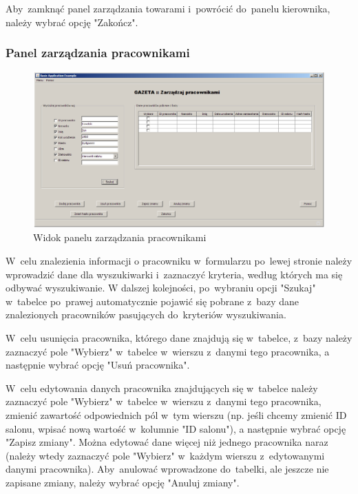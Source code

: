 Aby~zamknąć panel zarządzania towarami i~powrócić do~panelu kierownika, należy wybrać opcję "Zakończ".
\clearpage
\subsubsection{Panel zarządzania pracownikami}
\begin{figure}[h]
\begin{center}
\includegraphics[width=20cm,angle=90,keepaspectratio]{gfx/zarzadzaj_pracownikami.png}
\end{center}
\caption{Widok panelu zarządzania pracownikami}
\end{figure}
W~celu znalezienia informacji o pracowniku w~formularzu po~lewej stronie należy wprowadzić dane dla wyszukiwarki i~zaznaczyć kryteria, według których ma się odbywać wyszukiwanie. W dalszej kolejności, po~wybraniu opcji "Szukaj" w~tabelce po~prawej automatycznie pojawić się pobrane z~bazy dane znalezionych pracowników pasujących do~kryteriów wyszukiwania.

W~celu usunięcia pracownika, którego dane znajdują się w~tabelce, z~bazy należy zaznaczyć pole "Wybierz" w~tabelce w~wierszu z~danymi tego pracownika, a następnie wybrać opcję "Usuń pracownika".

W~celu edytowania danych pracownika znajdujących się w~tabelce należy zaznaczyć pole "Wybierz" w~tabelce w~wierszu z~danymi tego pracownika, zmienić zawartość odpowiednich pól w~tym wierszu (np. jeśli chcemy zmienić ID salonu, wpisać nową wartość w~kolumnie "ID salonu"), a następnie wybrać opcję "Zapisz zmiany". Można edytować dane więcej niż jednego pracownika naraz (należy wtedy zaznaczyć pole "Wybierz" w~każdym wierszu z~edytowanymi danymi pracownika). Aby~anulować wprowadzone do~tabelki, ale jeszcze nie zapisane zmiany, należy wybrać opcję "Anuluj zmiany".

